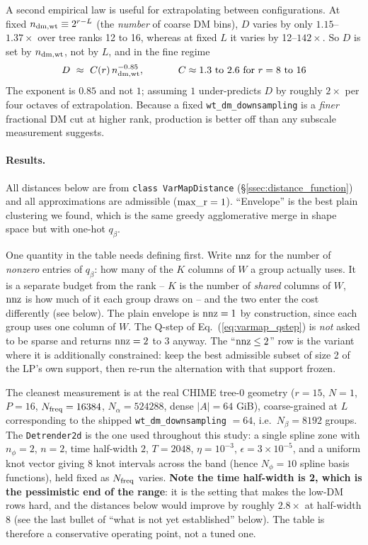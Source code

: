 \documentclass{article}
\numberwithin{equation}{section}   %
\begin{document}
A second empirical law is useful for extrapolating between configurations. At fixed
$n_{\rm dm,wt} \equiv 2^{r-L}$ (the {\em number} of coarse DM bins), $D$ varies by only
$1.15$--$1.37\times$ over tree ranks 12 to 16, whereas at fixed $L$ it varies by 12--$142\times$.
So $D$ is set by $n_{\rm dm,wt}$, not by $L$, and in the fine regime
\begin{equation}
D \ \approx \ C(r) \, n_{\rm dm,wt}^{-0.85},
\hspace{1.2cm} C \approx 1.3 \ \mbox{to} \ 2.6 \ \mbox{for} \ r = 8 \ \mbox{to} \ 16
\end{equation}
The exponent is $0.85$ and not $1$; assuming $1$ under-predicts $D$ by roughly $2\times$ per
four octaves of extrapolation. Because a fixed \verb|wt_dm_downsampling| is a {\em finer}
fractional DM cut at higher rank, production is better off than any subscale measurement
suggests.

\paragraph*{Results.}
All distances below are from \verb|class VarMapDistance| (\S\ref{ssec:distance_function}) and all
approximations are admissible (${\rm max\_r} = 1$). ``Envelope'' is the best plain clustering we
found, which is the same greedy agglomerative merge in shape space but with one-hot $q_\beta$.

One quantity in the table needs defining first. Write ${\rm nnz}$ for the number of {\em nonzero}
entries of $q_\beta$: how many of the $K$ columns of $W$ a group actually uses. It is a
separate budget from the rank -- $K$ is the number of {\em shared} columns of $W$, ${\rm nnz}$ is
how much of it each group draws on -- and the two enter the cost differently (see below).
The plain envelope is ${\rm nnz} = 1$ by construction, since each group uses one column of $W$.
The Q-step of Eq.\ (\ref{eq:varmap_qstep}) is {\em not} asked to be sparse and returns
${\rm nnz} = 2$ to $3$ anyway. The ``${\rm nnz} \le 2$'' row is the variant where it is
additionally constrained: keep the best admissible subset of size 2 of the LP's own support,
then re-run the alternation with that support frozen.

The cleanest measurement is at the real CHIME tree-0 geometry ($r{=}15$, $N{=}1$, $P{=}16$,
$N_{\rm freq} = 16384$, $N_\alpha = 524288$, dense $|A| = 64$ GiB), coarse-grained at
$L$ corresponding to the shipped \verb|wt_dm_downsampling| $=64$, i.e.\ $N_\beta = 8192$ groups.
The {\tt Detrender2d} is the one used throughout this study: a single spline zone with
$n_\phi = 2$, $n = 2$, time half-width $2$, $T = 2048$, $\eta = 10^{-3}$,
$\epsilon = 3\times10^{-5}$, and a uniform knot vector giving 8 knot intervals across the band
(hence $N_\phi = 10$ spline basis functions), held fixed as $N_{\rm freq}$ varies.
{\bf Note the time half-width is 2, which is the pessimistic end of the range}: it is the
setting that makes the low-DM rows hard, and the distances below would improve by roughly
$2.8\times$ at half-width 8 (see the last bullet of ``what is not yet established'' below).
The table is therefore a conservative operating point, not a tuned one.
\end{document}
